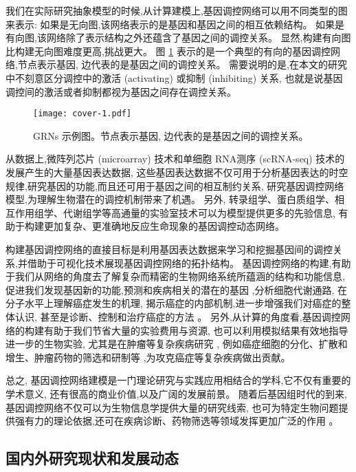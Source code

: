 我们在实际研究抽象模型的时候,从计算建模上,基因调控网络可以用不同类型的图来表示:
如果是无向图,该网络表示的是基因和基因之间的相互依赖结构。
如果是有向图,该网络除了表示结构之外还蕴含了基因之间的调控关系。
显然,构建有向图比构建无向图难度更高,挑战更大。
图 \ref{cover-1} 表示的是一个典型的有向的基因调控网络,节点表示基因, 边代表的是基因之间的调控关系。
需要说明的是,在本文的研究中不刻意区分调控中的激活 (activating) 或抑制 (inhibiting) 关系,
也就是说基因调控间的激活或者抑制都视为基因之间存在调控关系。
\begin{figure}[!htbp]
    \centering
    \texttt{[image: cover-1.pdf]}
    \caption{GRNs 示例图。节点表示基因, 边代表的是基因之间的调控关系。}
    \label{cover-1}
\end{figure}

从数据上,微阵列芯片 (microarray) 技术和单细胞 RNA测序 (scRNA-seq) 技术的发展产生的大量基因表达数据,
这些基因表达数据不仅可用于分析基因表达的时空规律,研究基因的功能,而且还可用于基因之间的相互制约关系,
研究基因调控网络模型,为理解生物潜在的调控机制带来了机遇。
另外, 转录组学、蛋白质组学、相互作用组学、代谢组学等高通量的实验室技术可以为模型提供更多的先验信息,
有助于构建更加复杂、更准确地反应生命现象的基因调控动态网络。

构建基因调控网络的直接目标是利用基因表达数据来学习和挖掘基因间的调控关系,并借助于可视化技术展现基因调控网络的拓扑结构。
基因调控网络的构建,有助于我们从网络的角度去了解复杂而精密的生物网络系统所蕴涵的结构和功能信息,
促进我们发现基因新的功能,预测和疾病相关的潜在的基因 \cite{lee2009computational},分析细胞代谢通路,
在分子水平上理解癌症发生的机理,
揭示癌症的内部机制,进一步增强我们对癌症的整体认识,
甚至是诊断、控制和治疗癌症的方法 \cite{kreeger2009cancer,yan2016biological}。
另外,从计算的角度看,基因调控网络的构建有助于我们节省大量的实验费用与资源,
也可以利用模拟结果有效地指导进一步的生物实验,
尤其是在肿瘤等复杂疾病研究 \cite{boyle2017expanded},
例如癌症细胞的分化、扩散和增生、肿瘤药物的筛选和研制等 \cite{hurley2011gene},为攻克癌症等复杂疾病做出贡献。

总之, 基因调控网络建模是一门理论研究与实践应用相结合的学科,它不仅有重要的学术意义,
还有很高的商业价值,以及广阔的发展前景。
随着后基因组时代的到来,基因调控网络不仅可以为生物信息学提供大量的研究线索,
也可为特定生物问题提供强有力的理论依据,还可在疾病诊断、药物筛选等领域发挥更加广泛的作用 \cite{kreeger2009cancer}。

\subsection{国内外研究现状和发展动态}

